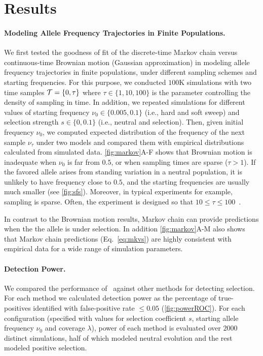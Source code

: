 \section{Results}
\paragraph{Modeling Allele Frequency Trajectories in Finite Populations.} 
We first tested the goodness of fit of the discrete-time Markov chain
versus continuous-time Brownian motion (Gaussian approximation) in modeling 
allele frequency
trajectories in finite populations, under different sampling schemes
and starting frequencies.  For this purpose, we conducted $100$K
simulations with two time samples ${\cal T}=\{0,\tau\}$ where $\tau\in
\{1,10,100\}$ is the parameter controlling the density of sampling
in time.  In addition, we repeated simulations for different values of
starting frequency $\nu_0\in\{0.005,0.1\}$ (i.e., hard and soft sweep)
and selection strength $s\in\{0,0.1\}$ (i.e., neutral and
selection). Then, given initial frequency $\nu_0$, we computed
expected distribution of the frequency of the next sample $\nu_\tau$
under two models and compared them with empirical distributions
calculated from simulated data.  \ref{fig:markov}A-F shows that
Brownian motion is inadequate when $\nu_0$ is
far from $0.5$, or when sampling times are sparse ($\tau>1$). If the
favored allele arises from standing variation in a neutral population,
it is unlikely to have frequency close to $0.5$, and the starting
frequencies are usually much smaller (see
\ref{fig:sfs}). Moreover, in typical \dmel experiments for
example, sampling is sparse. Often, the experiment is designed so that
$10\le\tau\le100$~\cite{kofler2013guide, orozco2012adaptation,
  zhou2011experimental,franssen2015patterns}.

In contrast to the Brownian motion results,  Markov chain can provide 
predictions when the the allele is under selection. In addition 
\ref{fig:markov}A-M
also shows that Markov chain predictions (Eq.~\ref{eq:mkvs}) are
highly consistent with empirical data for a wide range of simulation
parameters.

\paragraph{Detection Power.} 
We compared the performance of \comale\ against other methods for
detecting selection. For each method we calculated detection power as the 
percentage of true-positives identified with false-positive rate $\le 0.05$
(\ref{fig:powerROC}). For each
configuration (specified with values for selection coefficient $s$,
starting allele frequency $\nu_0$ and coverage $\lambda$), power of each method 
is evaluated over $2000$ distinct simulations, half of which modeled neutral 
evolution
and the rest modeled positive selection.

